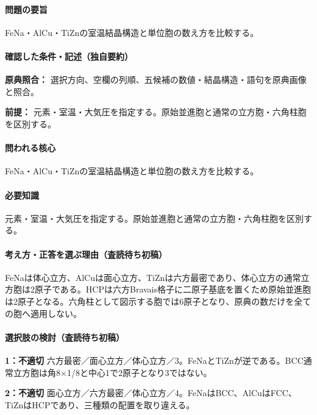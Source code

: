 \paragraph{問題の要旨} FeNa・AlCu・TiZnの室温結晶構造と単位胞の数え方を比較する。

\paragraph{確認した条件・記述（独自要約）}\mbox{}\par

\noindent\textbf{原典照合：} 選択方向、空欄の列順、五候補の数値・結晶構造・語句を原典画像と照合。\par

\noindent\textbf{前提：} 元素・室温・大気圧を指定する。原始並進胞と通常の立方胞・六角柱胞を区別する。\par

\paragraph{問われる核心} FeNa・AlCu・TiZnの室温結晶構造と単位胞の数え方を比較する。

\paragraph{必要知識} 元素・室温・大気圧を指定する。原始並進胞と通常の立方胞・六角柱胞を区別する。

\paragraph{考え方・正答を選ぶ理由（査読待ち初稿）} FeNaは体心立方、AlCuは面心立方、TiZnは六方最密であり、体心立方の通常立方胞は2原子である。HCPは六方Bravais格子に二原子基底を置くため原始並進胞は2原子となる。六角柱として図示する胞では6原子となり、原典の数だけを全ての胞へ適用しない。

\paragraph{選択肢の検討（査読待ち初稿）}\mbox{}\par

\noindent\textbf{1：不適切} 六方最密／面心立方／体心立方／3。FeNaとTiZnが逆である。BCC通常立方胞は角8×1/8と中心1で2原子となり3ではない。\par

\noindent\textbf{2：不適切} 面心立方／六方最密／体心立方／4。FeNaはBCC、AlCuはFCC、TiZnはHCPであり、三種類の配置を取り違える。\par

